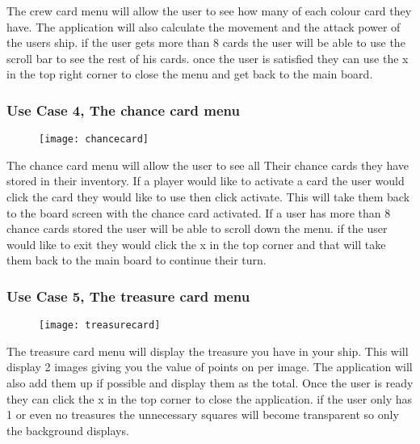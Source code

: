 \documentclass{article}
\begin{document}
The crew card menu will allow the user to see how many of each colour card they have. The application will also calculate the movement and the attack power of the users ship. if the user gets more than 8 cards the user will be able to use the scroll bar to see the rest of his cards. once the user is satisfied they can use the x in the top right corner to close the menu and get back to the main board. \\

	\subsubsection{Use Case 4, The chance card menu}
	
		\begin{figure}[H]
		\centering
		\texttt{[image: chancecard]}
		\label{fig:chancecard}
		\end{figure}
	
	The chance card menu will allow the user to see all Their chance cards they have stored in their inventory. If a player would like to activate a card the user would click the card they would like to use then click activate. This will take them back to the board screen with the chance card activated. If a user has more than 8 chance cards stored the user will be able to scroll down the menu. if the user would like to exit they would click the x in the top corner and that will take them back to the main board to continue their turn.
	
	\subsubsection{Use Case 5, The treasure card menu}
	
		\begin{figure}[H]
		\centering
		\texttt{[image: treasurecard]}
		\label{fig:Treasurecard}
		\end{figure}	
		
		The treasure card menu will display the treasure you have in your ship. This will display 2 images giving you the value of points on per image. The application will also add them up if possible and display them as the total. Once the user is ready they can click the x in the top corner to close the application. if the user only has 1 or even no treasures the unnecessary squares will become transparent so only the background displays.
	
\end{document}

